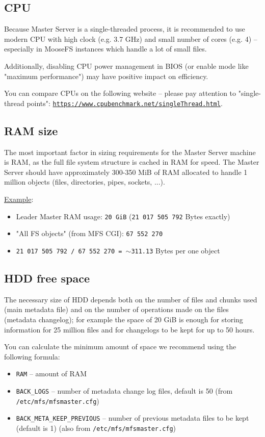 \documentclass[a4paper,11pt,english]{report}
\def\code#1{\texttt{#1}}
\begin{document}
			\subsection{CPU}
			
			Because Master Server is a single-threaded process, it is recommended to use modern CPU with high clock (e.g. 3.7 GHz) and small number of cores (e.g. 4) -- especially in MooseFS instances which handle a lot of small files.
			
			Additionally, disabling CPU power management in BIOS (or enable mode like "maximum performance") may have positive impact on efficiency.
			
			You can compare CPUs on the following website -- please pay attention to "single-thread points": \code{\url{https://www.cpubenchmark.net/singleThread.html}}.
			

			\subsection{RAM size}
			
			The most important factor in sizing requirements for the Master Server machine is RAM, as the full file system structure is cached in RAM for speed. The Master Server should have approximately 300-350 MiB of RAM allocated to handle 1 million objects (files, directories, pipes, sockets, ...).
			
			\underline{Example}:
			\begin{itemize}
				\item Leader Master RAM usage: \code{20 GiB} (\code{21 017 505 792} Bytes exactly)
				\item "All FS objects" (from MFS CGI): \code{67 552 270}
				\item \code{21 017 505 792 / 67 552 270 = $\sim$311.13} Bytes per one object
			\end{itemize}
			
			\subsection{HDD free space}
		
			The necessary size of HDD depends both on the number of files and chunks used (main metadata file) and on the number of operations made on the files (metadata changelog); for example the space of 20 GiB is enough for storing information for 25 million files and for changelogs to be kept for up to 50 hours.
			
			You can calculate the minimum amount of space we recommend using the following formula:
			\begin{itemize}
				\item \code{RAM} -- amount of RAM
				\item \code{BACK\_LOGS} -- number of metadata change log files, default is 50 (from \code{/etc/mfs/mfsmaster.cfg})
				\item \code{BACK\_META\_KEEP\_PREVIOUS} -- number of previous metadata files to be kept (default is 1) (also from \code{/etc/mfs/mfsmaster.cfg})
			\end{itemize}
			
\end{document}
